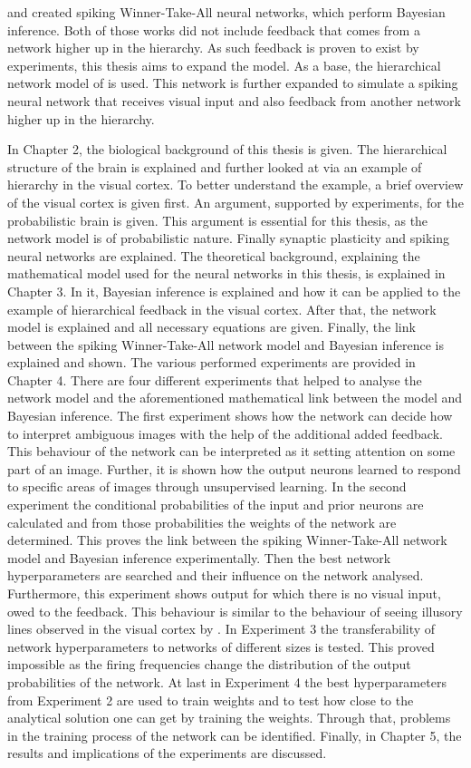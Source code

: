 \citet{nessler} and \citet{nesslerClone} created spiking Winner-Take-All  neural networks, which perform Bayesian inference. Both of those works did not include feedback that comes from a network higher up in the hierarchy. As such feedback is proven to exist by experiments, this thesis aims to expand the model. As a base, the hierarchical network model of \citet{nessler} is used. This network is further expanded to simulate a spiking neural network that receives visual input and also feedback from another network higher up in the hierarchy.

In Chapter 2, the biological background of this thesis is given. The hierarchical structure of the brain is explained and further looked at via an example of hierarchy in the visual cortex. To better understand the example, a brief overview of the visual cortex is given first. An argument, supported by experiments, for the probabilistic brain is given. This argument is essential for this thesis, as the network model is of probabilistic nature. Finally synaptic plasticity and spiking neural networks are explained.
The theoretical background, explaining the mathematical model used for the neural networks in this thesis, is explained in Chapter 3. In it, Bayesian inference is explained and how it can be applied to the example of hierarchical feedback in the visual cortex. After that, the network model  is explained and all necessary equations are given. Finally, the link between the spiking Winner-Take-All network model and Bayesian inference is explained and shown.
The various performed experiments are provided in Chapter 4. There are four different experiments that helped to analyse the network model and the aforementioned mathematical link between the model and Bayesian inference. The first experiment shows how the network can decide how to interpret ambiguous images with the help of the additional added feedback. This behaviour of the network can be interpreted as it setting attention on some part of an image. Further, it is shown how the output neurons learned to respond to specific areas of images through unsupervised learning. In the second experiment the conditional probabilities of the input and prior neurons are calculated and from those probabilities the weights of the network are determined. This proves the link between the spiking Winner-Take-All network model and Bayesian inference experimentally. Then the best network hyperparameters are searched and their influence on the network analysed. Furthermore, this experiment shows output for which there is no visual input, owed to the feedback. This behaviour is similar to the behaviour of seeing illusory lines observed in the visual cortex by \citet{HierachicalBayesVisualCortex}. In Experiment 3 the transferability of network hyperparameters to networks of different sizes is tested. This proved impossible as the firing frequencies change the distribution of the output probabilities of the network. At last in Experiment 4 the best hyperparameters from Experiment 2 are used to train weights and to test how close to the analytical solution one can get by training the weights. Through that, problems in the training process of the network can be identified.
Finally, in Chapter 5, the results and implications of the experiments are discussed.